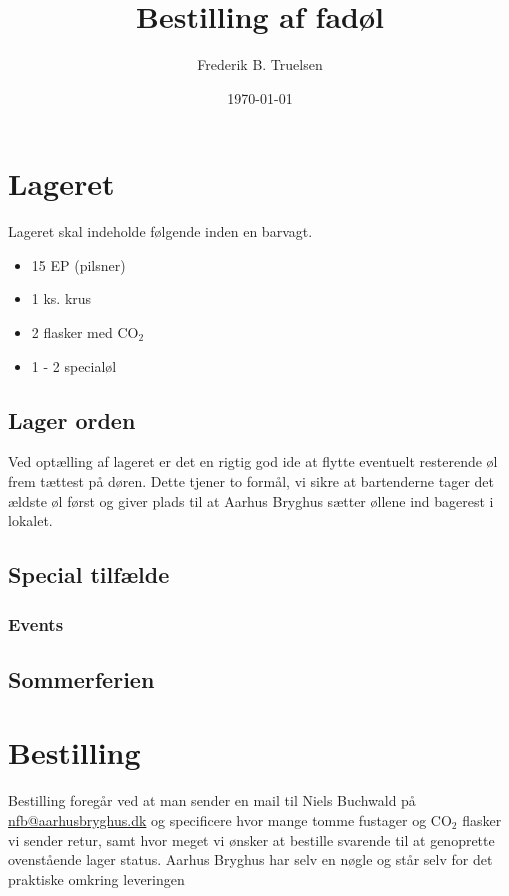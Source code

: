 

\title{Bestilling af fadøl}
\date{\today}
\author{Frederik B. Truelsen}



\maketitle

\section{Lageret}

Lageret skal indeholde følgende inden en barvagt.

\begin{itemize}
\item 15 EP (pilsner)
\item 1 ks. krus
\item 2 flasker med CO$_{2}$
\item 1 - 2 specialøl
\end{itemize} 

\subsection{Lager orden}

Ved optælling af lageret er det en rigtig god ide at flytte eventuelt resterende øl frem tættest på døren. 
Dette tjener to formål, vi sikre at bartenderne tager det ældste øl først og giver plads til at Aarhus Bryghus 
sætter øllene ind bagerest i lokalet.

\subsection{Special tilfælde}

\subsubsection*{Events}


\subsection*{Sommerferien}


\section{Bestilling}

Bestilling foregår ved at man sender en mail til Niels Buchwald på \href{mailto:nfb@aarhusbryghus.dk}{nfb@aarhusbryghus.dk} 
og specificere hvor mange tomme fustager og CO$_{2}$ flasker vi sender retur, samt hvor meget vi ønsker at bestille svarende til at genoprette ovenstående lager status. Aarhus Bryghus har selv en nøgle og står selv for det praktiske omkring leveringen

